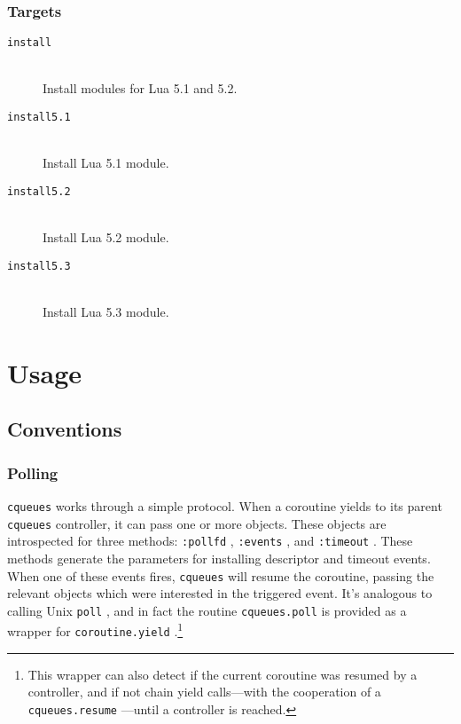 \documentclass[11pt, oneside]{memoir}
\newcommand{\cqueues}[0]{\texttt{cqueues} }
\newcommand{\syscall}[1]{\texttt{#1} }
\newcommand{\routine}[1]{\texttt{#1} }
\newcommand{\method}[1]{\texttt{#1} }
\begin{document}
\subsection{Targets}

\begin{description}

\item[\texttt{install}] \hfill \\
Install modules for Lua 5.1 and 5.2.

\item[\texttt{install5.1}] \hfill \\
Install Lua 5.1 module.

\item[\texttt{install5.2}] \hfill \\
Install Lua 5.2 module.

\item[\texttt{install5.3}] \hfill \\
Install Lua 5.3 module.

\end{description}


\chapter{Usage}

\section{Conventions}

\subsection{Polling}

\cqueues works through a simple protocol. When a coroutine yields to its parent \cqueues controller, it can pass one or more objects. These objects are introspected for three methods: \method{:pollfd}, \method{:events}, and \method{:timeout}. These methods generate the parameters for installing descriptor and timeout events. When one of these events fires, \cqueues will resume the coroutine, passing the relevant objects which were interested in the triggered event. It's analogous to calling Unix \syscall{poll}, and in fact the routine \routine{cqueues.poll} is provided as a wrapper for \routine{coroutine.yield}.\footnote{This wrapper can also detect if the current coroutine was resumed by a controller, and if not chain yield calls---with the cooperation of a \routine{cqueues.resume}---until a controller is reached.}
\end{document}
